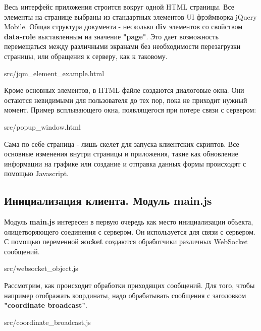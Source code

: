 Весь интерфейс приложения строится вокруг одной HTML страницы. Все элементы на странице выбраны из стандартных элементов UI фрэймворка jQuery Mobile. Общая структура документа - несколько \textbf{div} элементов со свойством \textbf{data-role} выставленным на значение \textbf{"page"}. Это дает возможность перемещаться между различными экранами без необходимости перезагрузки страницы, или обращения к серверу, как к таковому.


{src/jqm_element_example.html}

Кроме основных элементов, в HTML файле создаются диалоговые окна. Они остаются невидимыми для пользователя до тех пор, пока не приходит нужный момент. Пример всплывающего окна, появлящегося при потере связи с сервером:


{src/popup_window.html}

Сама по себе страница - лишь скелет для запуска клиентских скриптов. Все основные изменения внутри страницы и приложения, такие как обновление информации на графике или создание и отправка данных формы происходят с помощью Javascript.

\subsection{Инициализация клиента. Модуль main.js} \label{subsect3_2_2}

Модуль \textbf{main.js} интересен в первую очередь как место инициализации объекта, олицетворяющего соединения с сервером. Он используется для связи с сервером. С помощью переменной \textbf{socket} создаются обработчики различных WebSocket сообщений.


{src/websocket_object.js}

Рассмотрим, как происходит обработки приходящих сообщений. Для того, чтобы например отображать координаты, надо обрабатывать сообщения с заголовком \textbf{"coordinate broadcast"}.


{src/coordinate_broadcast.js}

